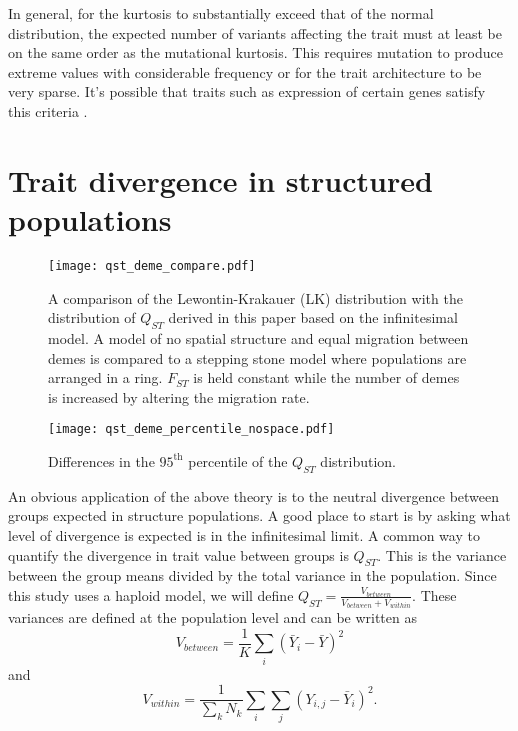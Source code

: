 \documentclass{article}
\begin{document}
In general, for the kurtosis to substantially exceed that of the normal
distribution, the expected number of variants affecting the trait must at least
be on the same order as the mutational kurtosis. This requires mutation to
produce extreme values with considerable frequency or for the trait architecture
to be very sparse. It's possible that traits such as expression of certain genes
satisfy this criteria \citep{Wheeler2016}.
\section{Trait divergence in structured populations}
\begin{figure}
  \centering
  \texttt{[image: qst\_deme\_compare.pdf]}
  \caption{A comparison of the Lewontin-Krakauer (LK) distribution with the
    distribution of $Q_{ST}$ derived in this paper based on the infinitesimal
    model. A model of no spatial structure and equal migration between demes is
    compared to a stepping stone model where populations are arranged in a ring.
    $F_{ST}$ is held constant while the number of demes is increased by altering
    the migration rate.}
  \label{fig:qst_deme}
\end{figure}
\begin{figure}
  \centering
  \texttt{[image: qst\_deme\_percentile\_nospace.pdf]}
  \caption{Differences in the $95^{\mathrm{th}}$ percentile of the $Q_{ST}$
    distribution.}
  \label{fig:qst_perc}
\end{figure}
An obvious application of the above theory is to the neutral divergence between
groups expected in structure populations. A good place to start is by asking
what level of divergence is expected is in the infinitesimal limit. A common way
to quantify the divergence in trait value between groups is $Q_{ST}$. This is
the variance between the group means divided by the total variance in the
population. Since this study uses a haploid model, we will define
$Q_{ST} = \frac{V_{between}}{V_{between} + V_{within}}$. These variances are defined at
the population level and can be written as
\begin{equation*}
  V_{between} = \frac{1}{K} \sum_i \left( \bar{Y}_i - \bar{Y} \right)^2
\end{equation*}
and
\begin{equation*}
  V_{within} = \frac{1}{\sum_k N_k} \sum_i \sum_j \left( Y_{i,j} - \bar{Y}_i \right)^2. 
\end{equation*}
\end{document}
